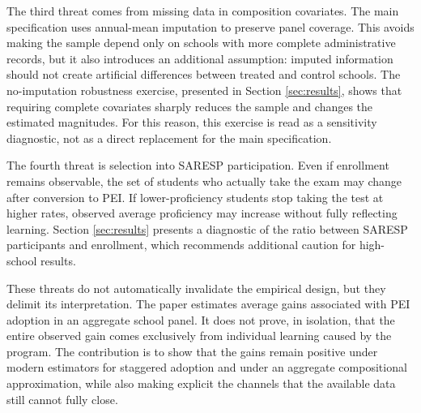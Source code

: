 The third threat comes from missing data in composition covariates. The main specification uses annual-mean imputation to preserve panel coverage. This avoids making the sample depend only on schools with more complete administrative records, but it also introduces an additional assumption: imputed information should not create artificial differences between treated and control schools. The no-imputation robustness exercise, presented in Section \ref{sec:results}, shows that requiring complete covariates sharply reduces the sample and changes the estimated magnitudes. For this reason, this exercise is read as a sensitivity diagnostic, not as a direct replacement for the main specification.

The fourth threat is selection into SARESP participation. Even if enrollment remains observable, the set of students who actually take the exam may change after conversion to PEI. If lower-proficiency students stop taking the test at higher rates, observed average proficiency may increase without fully reflecting learning. Section \ref{sec:results} presents a diagnostic of the ratio between SARESP participants and enrollment, which recommends additional caution for high-school results.

These threats do not automatically invalidate the empirical design, but they delimit its interpretation. The paper estimates average gains associated with PEI adoption in an aggregate school panel. It does not prove, in isolation, that the entire observed gain comes exclusively from individual learning caused by the program. The contribution is to show that the gains remain positive under modern estimators for staggered adoption and under an aggregate compositional approximation, while also making explicit the channels that the available data still cannot fully close.
